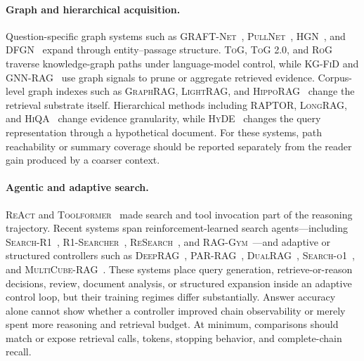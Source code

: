 \documentclass[manuscript,review]{acmart}
\theoremstyle{definition}
\theoremstyle{plain}
\theoremstyle{remark}
\begin{document}
\paragraph{Graph and hierarchical acquisition.}
Question-specific graph systems such as \textsc{GRAFT-Net}~\cite{sun2018graftnet},
\textsc{PullNet}~\cite{sun2019pullnet}, \textsc{HGN}~\cite{fang2020hgn}, and
\textsc{DFGN}~\cite{qiu2019dfgn} expand through entity--passage structure.
\textsc{ToG}, \textsc{ToG 2.0}, and \textsc{RoG}~\cite{sun2024tog,ma2024tog2,luo2024rog}
traverse knowledge-graph paths under language-model control, while
\textsc{KG-FiD} and \textsc{GNN-RAG}~\cite{yu2022kgfid,mavromatis2024gnnrag}
use graph signals to prune or aggregate retrieved evidence. Corpus-level graph
indexes such as \textsc{GraphRAG}, \textsc{LightRAG}, and
\textsc{HippoRAG}~\cite{edge2024graphrag,guo2024lightrag,gutierrez2024hipporag}
change the retrieval substrate itself. Hierarchical methods including
\textsc{RAPTOR}, \textsc{LongRAG}, and \textsc{HiQA}~\cite{sarthi2024raptor,jiang2024longrag,chen2024hiqa}
change evidence granularity, while \textsc{HyDE}~\cite{gao2023hyde} changes
the query representation through a hypothetical document. For these systems,
path reachability or summary coverage should be reported separately from the
reader gain produced by a coarser context.

\paragraph{Agentic and adaptive search.}
\textsc{ReAct} and \textsc{Toolformer}~\cite{yao2023react,schick2023toolformer}
made search and tool invocation part of the reasoning trajectory. Recent
systems span reinforcement-learned search agents---including
\textsc{Search-R1}~\cite{jin2025searchr1},
\textsc{R1-Searcher}~\cite{song2025r1searcher},
\textsc{ReSearch}~\cite{chen2025research}, and
\textsc{RAG-Gym}~\cite{xiong2025raggym}---and adaptive or structured
controllers such as \textsc{DeepRAG}~\cite{guan2025deeprag},
\textsc{PAR-RAG}~\cite{zhang2025parrag},
\textsc{DualRAG}~\cite{cheng2025dualrag},
\textsc{Search-o1}~\cite{li2025searcho1}, and
\textsc{MultiCube-RAG}~\cite{shi2026multicuberag}. These systems place query
generation, retrieve-or-reason decisions, review, document analysis, or
structured expansion inside an adaptive control loop, but their training
regimes differ substantially. Answer accuracy alone cannot show whether a
controller improved chain observability or merely spent more reasoning and
retrieval budget. At minimum, comparisons should match or expose retrieval
calls, tokens, stopping behavior, and complete-chain recall.
\end{document}
